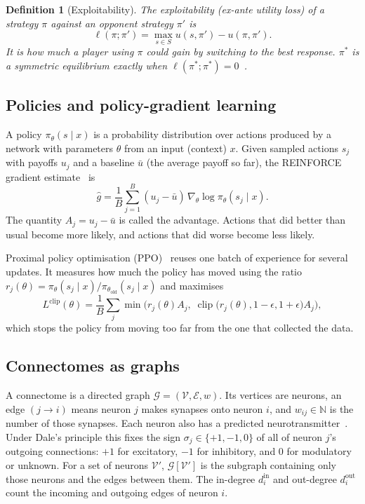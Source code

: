 \documentclass{article}
\newtheorem{definition}{Definition}
\newcommand{\G}{\mathcal{G}}
\newcommand{\Vset}{\mathcal{V}}
\newcommand{\Eset}{\mathcal{E}}
\newcommand{\clip}{\operatorname{clip}}
\newcommand{\expl}{\ell}
\begin{document}
\begin{definition}[Exploitability]
The exploitability (ex-ante utility loss) of a strategy $\pi$ against an opponent strategy $\pi'$ is
\[
\expl(\pi;\pi') = \max_{s\in S} u(s,\pi') - u(\pi,\pi').
\]
It is how much a player using $\pi$ could gain by switching to the best response. $\pi^*$ is a symmetric equilibrium exactly when $\expl(\pi^*;\pi^*) = 0$~\cite{bichler2021}.
\end{definition}

\subsection{Policies and policy-gradient learning}

A policy $\pi_\theta(s \mid x)$ is a probability distribution over actions produced by a network with parameters $\theta$ from an input (context) $x$. Given sampled actions $s_j$ with payoffs $u_j$ and a baseline $\bar u$ (the average payoff so far), the REINFORCE gradient estimate~\cite{williams1992} is
\[
\hat g = \frac1B \sum_{j=1}^{B} (u_j - \bar u)\, \nabla_\theta \log \pi_\theta(s_j \mid x).
\]
The quantity $A_j = u_j - \bar u$ is called the advantage. Actions that did better than usual become more likely, and actions that did worse become less likely.

Proximal policy optimisation (PPO)~\cite{schulman2017} reuses one batch of experience for several updates. It measures how much the policy has moved using the ratio $r_j(\theta) = \pi_\theta(s_j\mid x)/\pi_{\theta_{\mathrm{old}}}(s_j \mid x)$ and maximises
\[
L^{\mathrm{clip}}(\theta) = \frac1B \sum_j \min\!\Big( r_j(\theta) A_j,\; \clip\big(r_j(\theta), 1-\epsilon, 1+\epsilon\big) A_j\Big),
\]
which stops the policy from moving too far from the one that collected the data.

\subsection{Connectomes as graphs}

A connectome is a directed graph $\G = (\Vset, \Eset, w)$. Its vertices are neurons, an edge $(j \to i)$ means neuron $j$ makes synapses onto neuron $i$, and $w_{ij} \in \mathbb N$ is the number of those synapses. Each neuron also has a predicted neurotransmitter~\cite{eckstein2024}. Under Dale's principle this fixes the sign $\sigma_j \in \{+1,-1,0\}$ of all of neuron $j$'s outgoing connections: $+1$ for excitatory, $-1$ for inhibitory, and $0$ for modulatory or unknown. For a set of neurons $\Vset'$, $\G[\Vset']$ is the subgraph containing only those neurons and the edges between them. The in-degree $d^{\mathrm{in}}_i$ and out-degree $d^{\mathrm{out}}_i$ count the incoming and outgoing edges of neuron $i$.
\end{document}
